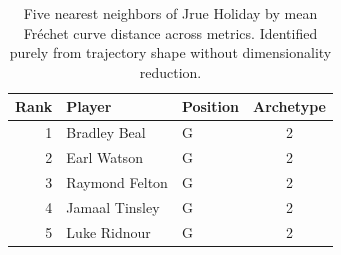 \begin{table}[htbp]
  \centering\small
  \begin{tabular}{rllc}
    \toprule
    Rank & Player & Position & Archetype \\
    \midrule
    1 & Bradley Beal & G & 2 \\
    2 & Earl Watson & G & 2 \\
    3 & Raymond Felton & G & 2 \\
    4 & Jamaal Tinsley & G & 2 \\
    5 & Luke Ridnour & G & 2 \\
    \bottomrule
  \end{tabular}
  \caption{Five nearest neighbors of Jrue Holiday by mean Fr\'{e}chet curve distance across metrics. Identified purely from trajectory shape without dimensionality reduction.}
  \label{tab:Jrue_Holiday_frechet_curve_neighbors}
\end{table}

